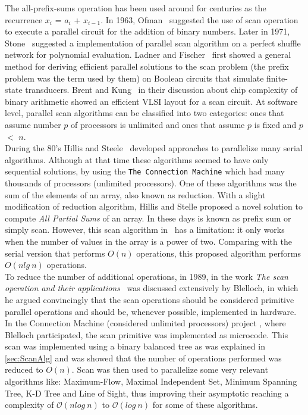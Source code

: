 \documentclass[Ingles]{ic-tese-v1}
\newcommand{\ttt}[1]{{\texttt{#1}}}
\begin{document}
The all-prefix-sums operation has been used around for centuries as the recurrence
$x_{i}$ = $a_{i}$ + $x_{i−1}$. In 1963, Ofman~\cite{Ofman:1962} suggested the use of scan operation to execute a parallel circuit for the addition of binary numbers.
Later in 1971, Stone~\cite{Stone:1971} suggested a implementation of parallel scan algorithm on a perfect shuffle network for polynomial evaluation.
Ladner and Fischer~\cite{Ladner:1980} first showed a general method for deriving efficient parallel solutions to the scan problem (the prefix problem was the term used by them) on Boolean circuits that simulate finite-state transducers. Brent and Kung~\cite{Brent:1981} in their discussion about chip complexity of binary arithmetic showed an efficient VLSI layout for a scan circuit.
At software level, parallel scan algorithms can be classified into two categories: ones that assume number $p$ of processors is unlimited and ones that assume $p$ is fixed and $p$ $<$ $n$.\\
During  the 80's  Hillis and  Steele~\cite{dataparallel} developed
approaches to parallelize many serial algorithms. Although at that time
these algorithms  seemed to have only  sequential solutions, by  using the
\ttt{The  Connection Machine}  \cite{themachine} which had many thousands of processors (unlimited processors). One of these algorithms was the sum of the elements of an  array, also known as  reduction.  With a slight modification of reduction algorithm, Hillis and Stelle proposed a novel solution to compute \textit{All Partial Sums} of an array. In these days is known  as prefix sum or simply scan. However, this scan algorithm in~\cite{dataparallel} has a limitation: it only works when the number of values in the array is a power of two. Comparing with the serial version that performs $O(n)$ operations, this proposed algorithm performs $O(n lg\ n)$ operations.\\
To reduce the number of additional operations, in 1989, in the work \textit{The scan operation and their applications}~\cite{ScanAsPrimitive} was discussed extensively by Blelloch, in which he argued convincingly that the scan operations should be considered primitive parallel operations and should be, whenever 	possible, implemented in hardware. In the Connection Machine (considered unlimited processors) project \cite{themachine}, where Blelloch participated, the scan primitive was implemented as microcode. This scan was  implemented using a binary balanced tree as was explained in  \ref{sec:ScanAlg} and was showed that the number of operations performed was reduced to $O(n)$.  Scan was  then used  to parallelize   some  very  relevant   algorithms  like: Maximum-Flow, Maximal Independent Set, Minimum Spanning Tree, K-D Tree and Line  of Sight, thus improving their asymptotic reaching a complexity of $\mathcal{O}(n log\ n)$ to $\mathcal{O}(log\ n)$ for some of these algorithms.\\
\end{document}
